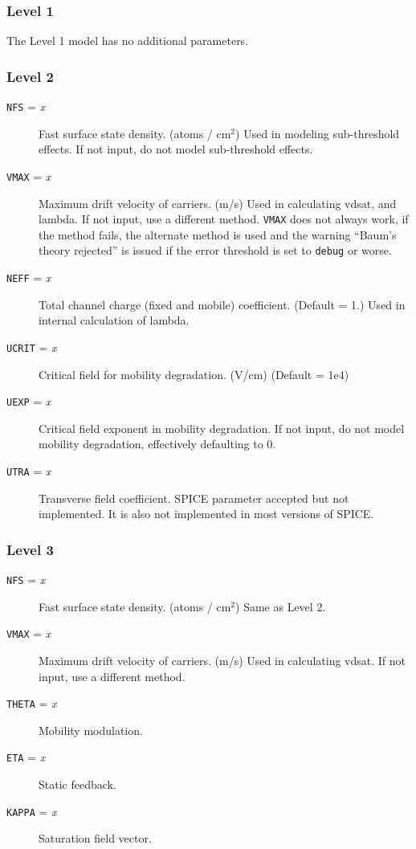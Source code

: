 \subsubsection{Level 1}

The Level 1 model has no additional parameters.

\subsubsection{Level 2}
\begin{description}

\item[{\tt NFS} = {\it x}]
Fast surface state density.  (atoms / cm$^2$) Used in modeling
sub-threshold effects.  If not input, do not model sub-threshold
effects.

\item[{\tt VMAX} = {\it x}]
Maximum drift velocity of carriers. (m/s) Used in calculating vdsat,
and lambda.  If not input, use a different method.  {\tt VMAX} does
not always work, if the method fails, the alternate method is used and
the warning ``Baum's theory rejected'' is issued if the error
threshold is set to {\tt debug} or worse.

\item[{\tt NEFF} = {\it x}]
Total channel charge (fixed and mobile) coefficient. (Default = 1.)
Used in internal calculation of lambda.

\item[{\tt UCRIT} = {\it x}]
Critical field for mobility degradation.  (V/cm) (Default = 1e4)

\item[{\tt UEXP} = {\it x}]
Critical field exponent in mobility degradation.  If not input, do not
model mobility degradation, effectively defaulting to 0.

\item[{\tt UTRA} = {\it x}]
Transverse field coefficient.  SPICE parameter accepted but not
implemented.  It is also not implemented in most versions of SPICE.

\end{description}
\subsubsection{Level 3}
\begin{description}

\item[{\tt NFS} = {\it x}]
Fast surface state density.  (atoms / cm$^2$) Same as Level 2.

\item[{\tt VMAX} = {\it x}]
Maximum drift velocity of carriers. (m/s) Used in calculating vdsat.
If not input, use a different method.

\item[{\tt THETA} = {\it x}]
Mobility modulation.

\item[{\tt ETA} = {\it x}]
Static feedback.

\item[{\tt KAPPA} = {\it x}]
Saturation field vector.

\end{description}
